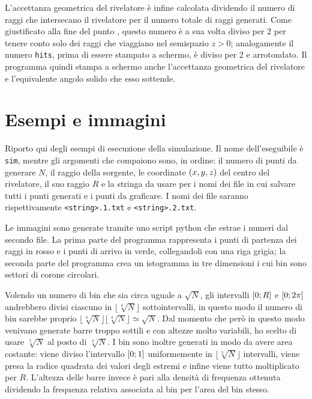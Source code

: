         L'accettanza geometrica del rivelatore è infine calcolata dividendo il numero di raggi che intersecano il rivelatore per il numero totale di raggi generati. Come giustificato alla fine del punto , questo numero è a sua volta diviso per \num{2} per tenere conto solo dei raggi che viaggiano nel semispazio $z > 0$; analogamente il numero \verb|hits|, prima di essere stampato a schermo, è diviso per \num{2} e arrotondato. Il programma quindi stampa a schermo anche l'accettanza geometrica del rivelatore e l'equivalente angolo solido che esso sottende.

    \section{Esempi e immagini}
        Riporto qui degli esempi di esecuzione della simulazione. Il nome dell'eseguibile è \verb|sim|, mentre gli argomenti che compaiono sono, in ordine: il numero di punti da generare $N$, il raggio della sorgente, le coordinate $\pqty{x,y,z}$ del centro del rivelatore, il suo raggio $R$ e la stringa da usare per i nomi dei file in cui salvare tutti i punti generati e i punti da graficare. I nomi dei file saranno rispettivamente \verb|<string>.1.txt| e \verb|<string>.2.txt|.

        Le immagini sono generate tramite uno script python che estrae i numeri dal secondo file. La prima parte del programma rappresenta i punti di partenza dei raggi in rosso e i punti di arrivo in verde, collegandoli con una riga grigia; la seconda parte del programma crea un istogramma in tre dimensioni i cui bin sono settori di corone circolari.
        
        Volendo un numero di bin che sia circa uguale a $\sqrt{N}$, gli intervalli $\bqty{0;R}$ e $\bqty{0;2\pi}$ andrebbero divisi ciascuno in $\lfloor\sqrt[4]{N}\rfloor$ sottointervalli, in questo modo il numero di bin sarebbe proprio $\lfloor\sqrt[4]{N}\rfloor\lfloor\sqrt[4]{N}\rfloor \simeq \sqrt{N}$. Dal momento che però in questo modo venivano generate barre troppo sottili e con altezze molto variabili, ho scelto di usare $\sqrt[5]{N}$ al posto di $\sqrt[4]{N}$. I bin sono inoltre generati in modo da avere area costante: viene diviso l'intervallo $\bqty{0;1}$ uniformemente in $\lfloor\sqrt[5]{N}\rfloor$ intervalli, viene presa la radice quadrata dei valori degli estremi e infine viene tutto moltiplicato per $R$. L'altezza delle barre invece è pari alla densità di frequenza ottenuta dividendo la frequenza relativa associata al bin per l'area del bin stesso.

